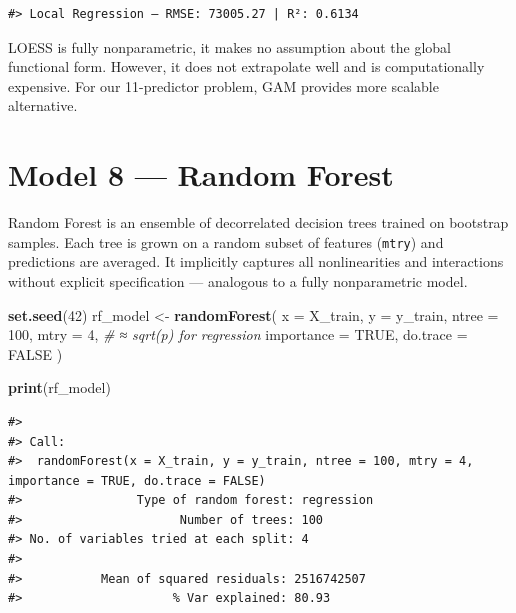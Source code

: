 \documentclass[
]{article}
\newenvironment{Shaded}{\begin{snugshade}}{\end{snugshade}}
\newcommand{\AttributeTok}[1]{\textcolor[rgb]{0.13,0.29,0.53}{#1}}
\newcommand{\CommentTok}[1]{\textcolor[rgb]{0.56,0.35,0.01}{\textit{#1}}}
\newcommand{\ConstantTok}[1]{\textcolor[rgb]{0.56,0.35,0.01}{#1}}
\newcommand{\DecValTok}[1]{\textcolor[rgb]{0.00,0.00,0.81}{#1}}
\newcommand{\FunctionTok}[1]{\textcolor[rgb]{0.13,0.29,0.53}{\textbf{#1}}}
\newcommand{\NormalTok}[1]{#1}
\newcommand{\OtherTok}[1]{\textcolor[rgb]{0.56,0.35,0.01}{#1}}
\begin{document}
\begin{verbatim}
#> Local Regression — RMSE: 73005.27 | R²: 0.6134
\end{verbatim}

LOESS is fully nonparametric, it makes no assumption about the global
functional form. However, it does not extrapolate well and is
computationally expensive. For our 11-predictor problem, GAM provides
more scalable alternative.

\section{Model 8 --- Random Forest}\label{rf}

Random Forest is an ensemble of decorrelated decision trees trained on
bootstrap samples. Each tree is grown on a random subset of features
(\texttt{mtry}) and predictions are averaged. It implicitly captures all
nonlinearities and interactions without explicit specification ---
analogous to a fully nonparametric model.

\begin{Shaded}
\begin{Highlighting}[]
\FunctionTok{set.seed}\NormalTok{(}\DecValTok{42}\NormalTok{)}
\NormalTok{rf\_model }\OtherTok{\textless{}{-}} \FunctionTok{randomForest}\NormalTok{(}
  \AttributeTok{x         =}\NormalTok{ X\_train,}
  \AttributeTok{y         =}\NormalTok{ y\_train,}
  \AttributeTok{ntree     =} \DecValTok{100}\NormalTok{,}
  \AttributeTok{mtry      =} \DecValTok{4}\NormalTok{,          }\CommentTok{\# ≈ sqrt(p) for regression}
  \AttributeTok{importance =} \ConstantTok{TRUE}\NormalTok{,}
  \AttributeTok{do.trace   =} \ConstantTok{FALSE}
\NormalTok{)}

\FunctionTok{print}\NormalTok{(rf\_model)}
\end{Highlighting}
\end{Shaded}

\begin{verbatim}
#> 
#> Call:
#>  randomForest(x = X_train, y = y_train, ntree = 100, mtry = 4,      importance = TRUE, do.trace = FALSE) 
#>                Type of random forest: regression
#>                      Number of trees: 100
#> No. of variables tried at each split: 4
#> 
#>           Mean of squared residuals: 2516742507
#>                     % Var explained: 80.93
\end{verbatim}
\end{document}
